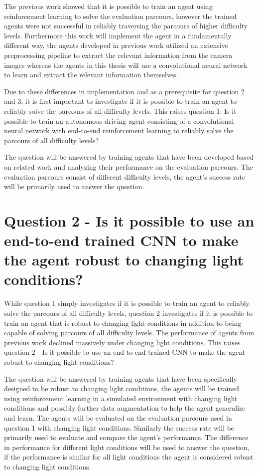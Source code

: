 The previous work \textcite{maximilian} showed that it is possible to train an agent using reinforcement learning to solve the evaluation parcours, however the trained agents were not successful in reliably traversing the parcours of higher difficulty levels. Furthermore this work will implement the agent in a fundamentally different way, the agents developed in previous work utilized an extensive preprocessing pipeline to extract the relevant information from the camera images whereas the agents in this thesis will use a convolutional neural network to learn and extract the relevant information themselves.

Due to these differences in implementation and as a prerequisite for question 2 and 3, it is first important to investigate if it is possible to train an agent to reliably solve the parcours of all difficulty levels. This raises question 1:
Is it possible to train an autonomous driving agent consisting of a convolutional neural network with end-to-end reinforcement learning to reliably solve the parcours of all difficulty levels?

The question will be answered by training agents that have been developed based on related work and analyzing their performance on the evaluation parcours. The evaluation parcours consist of different difficulty levels, the agent's success rate will be primarily used to answer the question.


\section{Question 2 - Is it possible to use an end-to-end trained CNN to make the agent robust to changing light conditions?}

While question 1 simply investigates if it is possible to train an agent to reliably solve the parcours of all difficulty levels, question 2 investigates if it is possible to train an agent that is robust to changing light conditions in addition to being capable of solving parcours of all difficulty levels. The performance of agents from previous work \textcite{maximilian} declined massively under changing light conditions. This raises question 2 - Is it possible to use an end-to-end trained CNN to make the agent robust to changing light conditions?

The question will be answered by training agents that have been specifically designed to be robust to changing light conditions, the agents will be trained using reinforcement learning in a simulated environment with changing light conditions and possibly further data augmentation to help the agent generalize and learn. The agents will be evaluated on the evaluation parcours used in question 1 with changing light conditions. Similarly the success rate will be primarily used to evaluate and compare the agent's performance. The difference in performance for different light conditions will be used to answer the question, if the performance is similar for all light conditions the agent is considered robust to changing light conditions.


